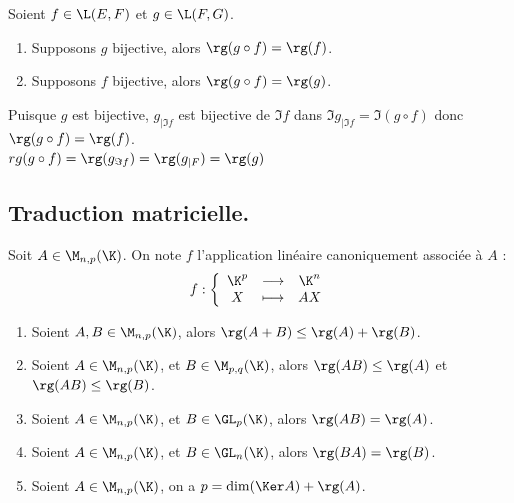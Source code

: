 \documentclass[11pt]{article}
\begin{document}
\vspace*{-0.7cm}

\begin{prop}{}{}
    Soient $f\in\L(E,F)$ et $g\in\L(F,G)$.
    \begin{enumerate}
        \item Supposons $g$ bijective, alors $\rg(g\circ f)=\rg(f)$.
        \item Supposons $f$ bijective, alors $\rg(g\circ f)=\rg(g)$.
    \end{enumerate}
    \tcblower
     Puisque $g$ est bijective, $g_{|\Im f}$ est bijective de $\Im f$ dans $\Im g_{|\Im f} = \Im(g\circ f)$ donc $\rg(g\circ f) = \rg(f)$.\\
     $rg(g\circ f) = \rg(g_{\Im f}) = \rg(g_{|F}) = \rg(g)$
\end{prop}

\vspace*{-0.7cm}

\subsection*{Traduction matricielle.}

\begin{defi}{}{}
    Soit $A\in \M_{n,p}(\K)$. On note $f$ l'application linéaire canoniquement associée à $A$ :
    \begin{equation*}
        f : \left\{ \begin{array}{ccc}
            \K^p & \longrightarrow & \K^n \\
            X & \longmapsto & AX
        \end{array}\right.
    \end{equation*}
\end{defi}

\vspace*{-0.7cm}

\begin{prop}{}{}
    \begin{enumerate}
        \item Soient $A,B\in \M_{n,p}(\K)$, alors $\rg(A+B)\leq\rg(A)+\rg(B)$.
        \item Soient $A\in \M_{n,p}(\K)$, et $B\in\M_{p,q}(\K)$, alors $\rg(AB)\leq \rg(A)$ et $\rg(AB)\leq \rg(B)$.
        \item Soient $A\in \M_{n,p}(\K)$, et $B\in\GL_p(\K)$, alors $\rg(AB)=\rg(A)$.
        \item Soient $A\in \M_{n,p}(\K)$, et $B\in\GL_n(\K)$, alors $\rg(BA)=\rg(B)$.
        \item Soient $A\in \M_{n,p}(\K)$, on a $p=\dim(\Ker A)+\rg(A)$.
    \end{enumerate}
\end{prop}
\end{document}
